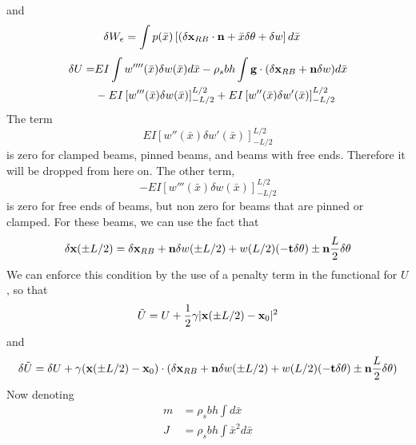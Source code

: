 \documentclass{article}
\begin{document}
and 
\begin{align*}
\delta W_e &= \int p(\bar{x}) \left[ (\delta {\bf x}_{RB}\cdot {\bf n} + \bar{x}\delta \theta  + \delta w \right] d\bar{x}
\end{align*}
\begin{align*}
\delta U = &EI \int w''''(\bar{x})\delta w(\bar{x}) d\bar{x} - \rho_s b h \int {\bf g}\cdot (\delta {\bf x}_{RB}+ {\bf n} \delta w) d\bar{x} \\
           &-EI \left[ w'''(\bar{x})\delta w(\bar{x}) \right]_{-L/2}^{L/2} + EI \left[ w''(\bar{x})\delta w'(\bar{x}) \right]_{-L/2}^{L/2} 
\end{align*}
The term 
\[ EI \left[ w''(\bar{x})\delta w'(\bar{x}) \right]_{-L/2}^{L/2}  \]
is zero for clamped beams, pinned beams, and beams with free ends.  Therefore it will be dropped from here on.
The other term,
\[ -EI \left[ w'''(\bar{x})\delta w(\bar{x}) \right]_{-L/2}^{L/2} \]
is zero for free ends of beams, but non zero for beams that are pinned or clamped.  
For these beams, we can use the fact that
\[ \delta {\bf x}(\pm L/2) = \delta {\bf x}_{RB} + {\bf n}\delta w(\pm L/2) + w(L/2)(-{\bf t}\delta \theta)\pm{\bf n}\frac{L}{2}\delta \theta \]
We can enforce this condition by the use of a penalty term in the functional for $U$, so that
\[ \tilde{U} = U + \frac{1}{2}\gamma |{\bf x}(\pm L/2) - {\bf x}_0|^2 \]
and
\[ \delta \tilde{U} = \delta U + \gamma ({\bf x}(\pm L/2) - {\bf x}_0)\cdot(\delta {\bf x}_{RB} + {\bf n}\delta w(\pm L/2) + w(L/2)(-{\bf t}\delta \theta)\pm{\bf n}\frac{L}{2}\delta \theta) \]
Now denoting 
\begin{subequations}
\label{equations1}
\begin{align}
\label{eq:eq6300a}
 m &= \rho_s b h \int d\bar{x} \\
\label{eq:eq6300b}
 J &= \rho_s b h \int \bar{x}^2 d\bar{x} 
\end{align}
\end{subequations}
\end{document}

